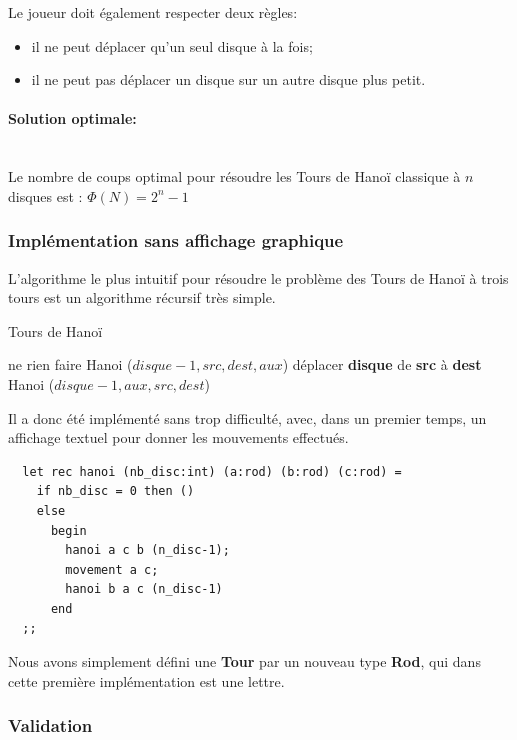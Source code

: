 \documentclass[a4paper,11pt]{article}
\begin{document}
Le joueur doit également respecter deux règles:
\begin{itemize}
\item il ne peut déplacer qu'un seul disque à la fois;
\item il ne peut pas déplacer un disque sur un autre disque plus petit.
\end{itemize}

\paragraph{Solution optimale:}\mbox{}\\
Le nombre de coups optimal pour résoudre les Tours de Hanoï classique à $n$ disques est : \(\Phi(N) = 2^{n}-1\)
\newpage
\subsubsection{Implémentation sans affichage graphique}
\label{sec:algoBase}
L'algorithme le plus intuitif pour résoudre le problème des Tours de Hanoï à trois tours
est un algorithme récursif très simple.

\begin{algorithm}
  \caption{Tours de Hanoï}\label{algo:hanoi1}
  \begin{algorithmic}[1]
     
    ne rien faire
    \Else
    \State Hanoi ($disque - 1, src, dest, aux$)
    \State déplacer \textbf{disque} de \textbf{src} à \textbf{dest}
    \State Hanoi ($disque - 1, aux, src, dest$)
    \EndIf
    \EndProcedure
\end{algorithmic}
\end{algorithm}

Il a donc été implémenté sans trop difficulté, avec, dans un premier temps,  un affichage textuel pour donner les mouvements effectués.
\begin{lstlisting}
  let rec hanoi (nb_disc:int) (a:rod) (b:rod) (c:rod) =
    if nb_disc = 0 then ()
    else
      begin
        hanoi a c b (n_disc-1);
        movement a c;
        hanoi b a c (n_disc-1)
      end
  ;;
\end{lstlisting}

Nous avons simplement défini une \textbf{Tour} par un nouveau type \textbf{Rod}, qui dans cette première implémentation est une lettre.

\subsubsection{Validation}
\end{document}
